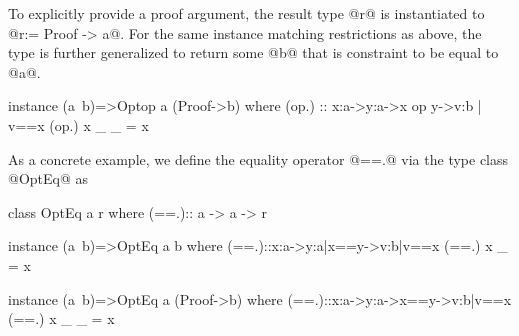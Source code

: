 %
To explicitly provide a proof argument,
the result type @r@ is instantiated to @r:= Proof -> a@.
%
For the same instance matching restrictions as above,
the type is further generalized to return some @b@
that is constraint to be equal to @a@.
%
\begin{code}
  instance (a~b)=>Optop a (Proof->b) where
  (op.) :: x:a->y:a->{x op y}->{v:b | v==x }
  (op.) x _ _ = x
\end{code}
%
As a concrete example, we define the equality operator @==.@
via the type class @OptEq@ as
\begin{code}
  class OptEq a r where
   (==.):: a -> a -> r

  instance (a~b)=>OptEq a b where
   (==.)::x:a->y:{a|x==y}->{v:b|v==x}
   (==.) x _ = x

  instance (a~b)=>OptEq a (Proof->b) where
   (==.)::x:a->y:a->{x==y}->{v:b|v==x}
   (==.) x _ _ = x
\end{code}

